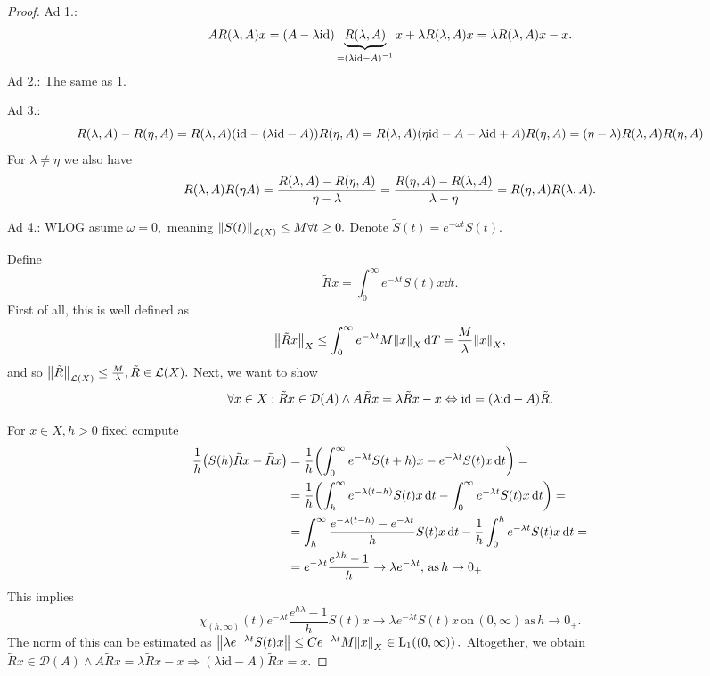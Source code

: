 \documentclass{article}
\begin{document}
\begin{proof}
    Ad 1.: 
    \[
	    A R(\lambda, A)x = \qty(A- \lambda \text{id})\underbrace{R(\lambda, A)}_{ = \qty(\lambda \text{id}-A)^{-1}}x + \lambda R(\lambda, A)x = \lambda R(\lambda, A)x - x.
    \]
    Ad 2.:
    The same as 1.

    Ad 3.:
    \begin{equation*}
	    R(\lambda, A) - R\qty(\eta, A) = R(\lambda, A)\qty(\text{id} - \qty(\lambda \text{id} - A))R\qty(\eta,A) = R\qty(\lambda,A)\qty(\eta \text{id} - A - \lambda \text{id} +A)R\qty(\eta,A) = \qty(\eta - \lambda)R\qty(\lambda, A)R\qty(\eta,A)
    \end{equation*}
    For $\lambda \neq \eta$ we also have
    \[
	    R\qty(\lambda,A) R\qty(\eta A) = \frac{R\qty(\lambda,A)-R\qty(\eta,A)}{\eta-\lambda} = \frac{R\qty(\eta,A)-R\qty(\lambda, A)}{\lambda-\eta} = R\qty(\eta,A) R\qty(\lambda,A).
    \]


    Ad 4.:
    WLOG asume $\omega = 0,$ meaning $\norm{S(t)}_{\mathcal{L}(X)}\leq M \forall t \geq 0.$ Denote $\tilde{S}(t) = e^{- \omega t}S(t).$



    Define
    \[
	    \tilde{R}x = \int_0^\infty e^{-\lambda t}S(t)x \dd{t}.
    \]
    First of all, this is well defined as
    \[
	    \norm{\tilde{R}x}_X \leq \int_0^{\infty}e^{-\lambda t}M \norm{x}_X \dd{T} = \frac{M}{\lambda}\norm{x}_X,
    \]
    and so $\norm{\tilde{R}}_{\mathcal{L}(X)} \leq \frac{M}{\lambda}, \tilde{R} \in \mathcal{L}(X).$ Next, we want to show
    \[
	    \forall x \in X: \tilde{R}x \in \mathcal{D}(A) \wedge A \tilde{R}x = \lambda \tilde{R}x -x \Leftrightarrow \text{id} = \qty(\lambda \text{id}-A)\tilde{R}.
    \]


    For $x \in X, h >0$ fixed compute
    \begin{align*}
	    \frac{1}{h}\qty(S(h)\tilde{R}x - \tilde{R}x) &= \frac{1}{h}\qty(\int_0^{\infty}e^{-\lambda t}S(t+h)x - e^{-\lambda t}S(t)x \dd{t})=\\
							 &= \frac{1}{h}\qty(\int_h^\infty e^{-\lambda\qty(t-h)}S(t) x \dd{t} - \int_0^{\infty} e^{-\lambda t}S(t) x \dd{t}) =\\
							 & = \int_h^{\infty} \frac{e^{-\lambda(t-h)}-e^{-\lambda t}}{h}S(t)x \dd{t} - \frac{1}{h}\int_0^h e^{-\lambda t}S(t) x\dd{t} =\\
							 & = e^{-\lambda t}\frac{e^{\lambda h}-1}{h} \to \lambda e^{-\lambda t}, \, \text{as} \, h \to 0_+
    \end{align*}
    This implies
    \[
	    \chi_{(h, \infty)}(t) e^{-\lambda t}\frac{e^{h \lambda}-1}{h}S(t)x \to \lambda e^{-\lambda t}S(t)x \, \text{on} \, (0, \infty) \, \text{as} \, h \to 0_+.
    \]
    The norm of this can be estimated as $\norm{\lambda e^{-\lambda t}S(t)x} \leq C e^{-\lambda t}M \norm{x}_X \in \LpSet[1]{(0, \infty)}.$ Altogether, we obtain $\tilde{R}x \in \mathcal{D}(A) \wedge A \tilde{R}x = \lambda \tilde{R}x -x \Rightarrow (\lambda \text{id} - A) \tilde{R}x = x.$


\end{proof}
\end{document}
